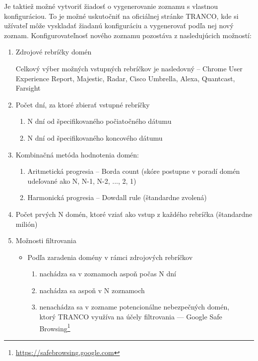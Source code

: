 Je taktiež možné vytvoriť žiadosť o vygenerovanie zoznamu s vlastnou konfiguráciou. 
To je možné uskutočniť na oficiálnej stránke TRANCO,
kde si užívateľ môže vyskladať žiadanú konfiguráciu a vygenerovať podľa nej nový zoznam.
Konfigurovateľnosť nového zoznamu pozostáva z nasledujúcich možností: \cite{tranco-config}
\begin{enumerate}
    \item Zdrojové rebríčky domén
    
    Celkový výber možných vstupných rebríčkov je nasledovný -- Chrome User Experience Report, Majestic, Radar, Cisco Umbrella, Alexa, Quantcast, Farsight
    
    \item Počet dní, za ktoré zbierať vstupné rebríčky
    \begin{enumerate}
        \item N dní od špecifikovaného počiatočného dátumu
        \item N dní od špecifikovaného koncového dátumu
    \end{enumerate}

    \item Kombinačná metóda hodnotenia domén:
    \begin{enumerate}
        \item Aritmetická progresia -- Borda count (skóre postupne v poradí domén udeľované ako N, N-1, N-2, ..., 2, 1)
        \item Harmonická progresia -- Dowdall rule (štandardne zvolená)
    \end{enumerate}

    \item Počet prvých N domén, ktoré vziať ako vstup z každého rebríčka (štandardne milión)

    \item Možnosti filtrovania
    \begin{itemize}
        \item Podľa zaradenia domény v rámci zdrojových rebríčkov
        \begin{enumerate}
            \item nachádza sa v zoznamoch aspoň počas N dní
            \item nachádza sa aspoň v N zoznamoch
            \item nenachádza sa v zozname potencionálne nebezpečných domén, \\ ktorý TRANCO využíva na účely filtrovania --- Google Safe Browsing\footnote{\href{https://safebrowsing.google.com}{https://safebrowsing.google.com}}
        \end{enumerate}


\end{itemize}
\end{enumerate}
